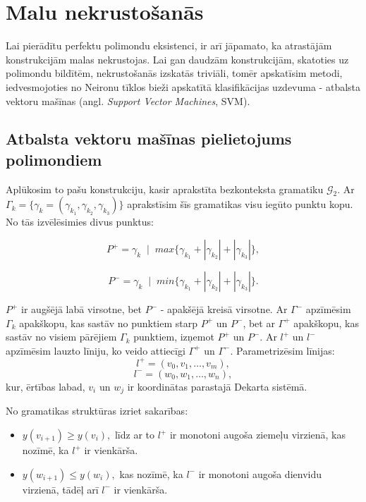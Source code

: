 \documentclass[utf8]{ludis2022}
\begin{document}
\section{Malu nekrustošanās}
\label{sect:no_intersects}

\firstparskip Lai pierādītu perfektu polimondu eksistenci, ir arī jāpamato, ka atrastājām konstrukcijām malas nekrustojas. Lai gan daudzām konstrukcijām, skatoties uz polimondu bildītēm, nekrustošanās izskatās triviāli, tomēr apskatīsim metodi, iedvesmojoties no Neironu tīklos bieži apskatītā klasifikācijas uzdevuma - atbalsta vektoru mašīnas (angl. {\it{Support Vector Machines}}, SVM). 





\subsection{Atbalsta vektoru mašīnas pielietojums polimondiem}


\firstparskip Aplūkosim to pašu konstrukciju, kasir aprakstīta bezkonteksta gramatiku 
$\mathcal{G}_2$. 
Ar $\Gamma_k = \{\gamma_k = (\gamma_{k_1}, \gamma_{k_2}, \gamma_{k_3})\}$ aprakstīsim šīs gramatikas visu iegūto punktu kopu. No tās izvēlēsimies divus punktus: 

\vspace{-10pt}

$$P^+ = \gamma_k \;\mid\;  max\{\gamma_{k_1}+|\gamma_{k_2}|+|\gamma_{k_3}|\},$$ 

\vspace{-10pt}

$$P^- = \gamma_k \;\mid\;  min\{\gamma_{k_1}+|\gamma_{k_2}|+|\gamma_{k_3}|\}.$$

 $P^+$ ir augšējā labā virsotne, bet $P^-$ - apakšējā kreisā virsotne. Ar $\Gamma^-$ apzīmēsim $\Gamma_k$ apakškopu, kas sastāv no punktiem starp $P^+$ un $P^-$, bet ar $\Gamma^+$ apakškopu, kas sastāv no visiem pārējiem $\Gamma_k$ punktiem, izņemot $P^+$ un $P^-$. Ar $l^+$ un $l^-$ apzīmēsim lauzto līniju, ko veido attiecīgi $\Gamma^+$ un $\Gamma^-$. Parametrizēsim līnijas:
\[
l^+=(v_0,v_1,\dots,v_m),
\]
\[
l^-=(w_0,w_1,\dots,w_n),
\]
kur, ērtības labad, $v_i$ un $w_j$ ir koordinātas parastajā Dekarta sistēmā.

No gramatikas struktūras izriet sakarības:

\vspace{-10pt}

\begin{itemize}
    \item $ y(v_{i+1})\ge y(v_i),$
līdz ar to $l^+$ ir monotoni augoša ziemeļu virzienā, kas nozīmē, ka $l^+$ ir vienkārša. \
\item $ y(w_{i+1})\le y(w_i),$
kas nozīmē, ka $l^-$ ir monotoni augoša dienvidu virzienā, tādēļ arī $l^-$ ir vienkārša.

\end{itemize}
\end{document}

